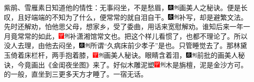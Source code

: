 紫鹃、雪雁素日知道他的情性：无事闷坐，不是愁眉，{\includegraphics[width=3mm]{../Images/00004}\includegraphics[width=3mm]{../Images/00011}\footnotesize \kaishu 画美人之秘诀。}便是长叹，且好端端的不知为了什么，便常常的就自泪自干。{\includegraphics[width=3mm]{../Images/00004}\includegraphics[width=3mm]{../Images/00011}\footnotesize \kaishu 补写，却是避繁文法。}先时还解劝，怕他思父母，想家乡，受了委曲，用话来宽慰解劝。谁知后来一年一月竟常常的如此，{\includegraphics[width=3mm]{../Images/00002}\includegraphics[width=3mm]{../Images/00011}\footnotesize \kaishu 补潇湘馆常文也。}把这个样儿看惯了，也都不理论了。所以没人去理，由他去闷坐，{\includegraphics[width=3mm]{../Images/00004}\includegraphics[width=3mm]{../Images/00011}\footnotesize \kaishu 所谓“久病床前少孝子”是也。}只管睡觉去了。那林黛玉倚着床栏杆，两手抱着膝，{\includegraphics[width=3mm]{../Images/00002}\includegraphics[width=3mm]{../Images/00011}\footnotesize \kaishu 画美人秘诀。}眼睛含着泪，{\includegraphics[width=3mm]{../Images/00004}\includegraphics[width=3mm]{../Images/00011}\footnotesize \kaishu 前批的画美人秘诀，今竟画出《金闺夜坐图》来了。}好似木雕泥塑{\includegraphics[width=3mm]{../Images/00002}\includegraphics[width=3mm]{../Images/00011}\footnotesize \kaishu 木是旃檀，泥是金沙方可。}的一般，直坐到三更多天方才睡了。一宿无话。

